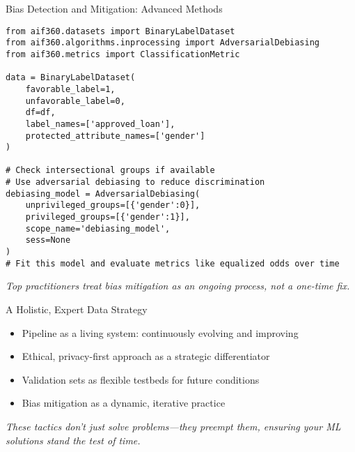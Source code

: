 \documentclass[aspectratio=169]{beamer}
\begin{document}
\begin{frame}{Bias Detection and Mitigation: Advanced Methods}
\begin{verbatim}
from aif360.datasets import BinaryLabelDataset
from aif360.algorithms.inprocessing import AdversarialDebiasing
from aif360.metrics import ClassificationMetric

data = BinaryLabelDataset(
    favorable_label=1,
    unfavorable_label=0,
    df=df,
    label_names=['approved_loan'],
    protected_attribute_names=['gender']
)

# Check intersectional groups if available
# Use adversarial debiasing to reduce discrimination
debiasing_model = AdversarialDebiasing(
    unprivileged_groups=[{'gender':0}],
    privileged_groups=[{'gender':1}],
    scope_name='debiasing_model',
    sess=None
)
# Fit this model and evaluate metrics like equalized odds over time
\end{verbatim}

\emph{Top practitioners treat bias mitigation as an ongoing process, not a one-time fix.}
\end{frame}

%
\begin{frame}{A Holistic, Expert Data Strategy}
\begin{itemize}
\item Pipeline as a living system: continuously evolving and improving
\item Ethical, privacy-first approach as a strategic differentiator
\item Validation sets as flexible testbeds for future conditions
\item Bias mitigation as a dynamic, iterative practice
\end{itemize}

\emph{These tactics don’t just solve problems—they preempt them, ensuring your ML solutions stand the test of time.}
\end{frame}
\end{document}

